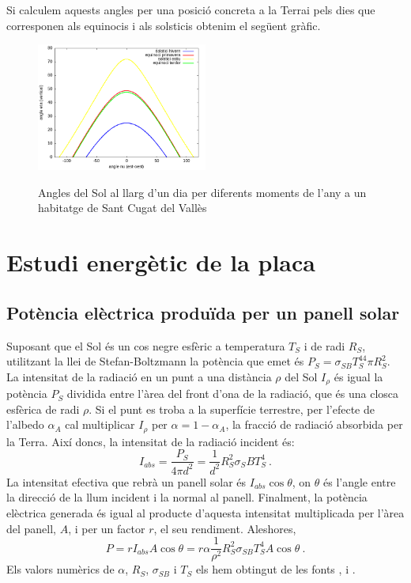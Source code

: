 \documentclass[11pt]{article}
\begin{document}
Si calculem aquests angles per una posició concreta a la Terrai pels dies que corresponen als equinocis i als solsticis obtenim el següent gràfic.
\begin{figure}[H]
    \centering
    \includegraphics[width=0.5\textwidth]{equinocis.png}
    \label{solsticis}
    \caption{Angles del Sol al llarg d'un dia per diferents moments de l'any a un habitatge de Sant Cugat del Vallès}
\end{figure}

\section{Estudi energètic de la placa}
\subsection{Potència elèctrica produïda per un panell solar}
Suposant que el Sol és un cos negre esfèric a temperatura $T_S$ i de radi $R_S$, utilitzant la llei de Stefan-Boltzmann la potència que emet és $P_S=\sigma_{SB}T_S^44\pi R_S^2$. La intensitat de la radiació en un punt a una distància ${\rho}$ del Sol $I_{\rho}$ és igual la potència $P_S$ dividida entre l'àrea del front d'ona de la radiació, que és una closca esfèrica de radi ${\rho}$. Si el punt es troba a la superfície terrestre,  per l’efecte de l’albedo $\alpha_A$ cal multiplicar $I_{\rho}$ per $\alpha=1-\alpha_A$, la fracció de radiació absorbida per la Terra. Així doncs, la intensitat de la radiació incident és:
\begin{equation}
    I_{abs} = \frac{P_S}{4\pi d^2}=\frac{1}{d^2}R_S^2\sigma_SB T_S^4 \ .
    \label{I_abs}
\end{equation}
La intensitat efectiva que rebrà un panell solar és $I_{abs} \cos{\theta}$, on $\theta$ és l'angle entre la direcció de la llum incident i la normal al panell. Finalment, la potència elèctrica generada és igual al producte d'aquesta intensitat multiplicada per l'àrea del panell, $A$, i per un factor $r$, el seu rendiment. Aleshores,
\begin{equation}
    P = r I_{abs} A \cos{\theta} = r \alpha \frac{1}{\rho^2}R_S^2\sigma_{SB}T_S^4A \cos{\theta} \ .
    \label{potencia placa}
\end{equation}
Els valors numèrics de $\alpha$, $R_S$, $\sigma_{SB}$ i $T_S$ els hem obtingut de les fonts \cite{Earth Fact Sheet}, \cite{Sun Fact Sheet} i \cite{Universe Glossary}.
\end{document}
